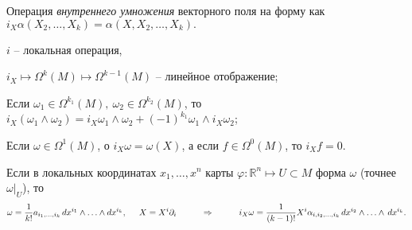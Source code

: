\begin{to_def} 
    Операция \textit{внутреннего умножения} векторного поля на форму как
    $ i_X \alpha(X_2, \ldots, X_k) = \alpha(X, X_2, \ldots, X_k).$
\end{to_def}

\begin{enumerate*}
    \item $i$ -- локальная операция,
    \item $i_X \mapsto \Omega^k (M) \mapsto \Omega^{k-1}(M)$ -- линейное отображение;
    \item Если $\omega_1 \in \Omega^{k_1}(M), \ \omega_2 \in \Omega^{k_2}(M)$, то $i_X(\omega_1 \wedge \omega_2) = i_X \omega_1 \wedge \omega_2 + (-1)^{k_1} \omega_1 \wedge i_X \omega_2$;
    \item Если $\omega \in \Omega^1 (M)$, о $i_X \omega = \omega(X)$, а если $f \in \Omega^0 (M)$, то $i_X f = 0$.
\end{enumerate*}

\begin{to_lem} 
     Если в локальных координатах $x_1,\ldots,x^n$ карты $\varphi \colon \mathbb{R}^n \mapsto U \subset M$ форма $\omega$ (точнее $\omega|_U$), то
\begin{equation*}
\omega = \frac{1}{k!} a_{i_1,\ldots,i_k}\, d x^{i_1}\wedge\ldots \wedge d x^{i_k},
\hspace{0.5cm} 
X = X^i \partial_i
\hspace{1cm} \Rightarrow \hspace{1cm} 
    i_X \omega = \frac{1}{(k-1)!}  X^i \alpha_{i,i_2,\ldots,i_k} \, d x^{i_2} \wedge \ldots \wedge \, d x^{i_k}.
\end{equation*}
\end{to_lem}
